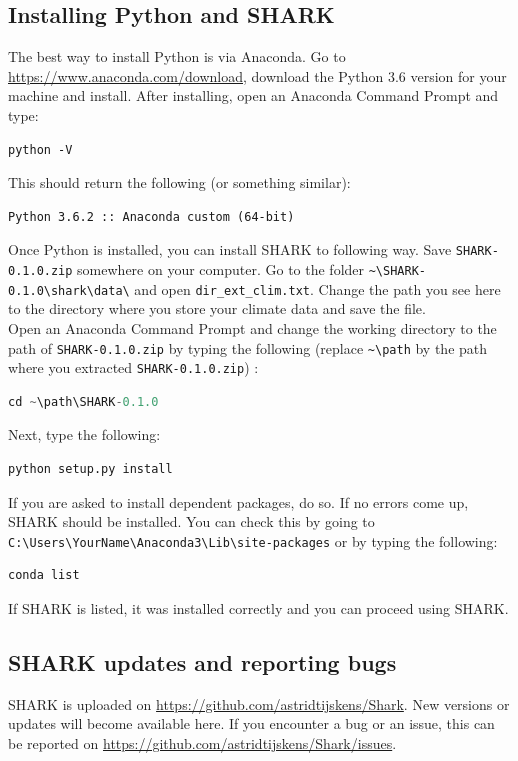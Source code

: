 \documentclass{article}
\newcommand{\file}[1]{{\small\texttt{#1}}}
\newcommand{\code}[1]{{\small\texttt{#1}}}
\begin{document}
\subsection{Installing Python and SHARK}
The best way to install Python is via Anaconda. Go to \url{https://www.anaconda.com/download}, download the Python 3.6 version for your machine and install. After installing, open an Anaconda Command Prompt and type:
\begin{lstlisting}[language=command.com]
python -V
\end{lstlisting}
This should return the following (or something similar):
\begin{lstlisting}[language=command.com]
Python 3.6.2 :: Anaconda custom (64-bit)
\end{lstlisting}
Once Python is installed, you can install SHARK to following way. Save \file{SHARK-0.1.0.zip} somewhere on your computer. Go to the folder \file{\textasciitilde{}\textbackslash{}SHARK-0.1.0\textbackslash{}shark\textbackslash{}data\textbackslash{}} and open \file{dir\_ext\_clim.txt}. Change the path you see here to the directory where you store your climate data and save the file. \\
Open an Anaconda Command Prompt and change the working directory to the path of \file{SHARK-0.1.0.zip} by typing the following (replace \code{\textasciitilde{}\textbackslash{}path} by the path where you extracted \file{SHARK-0.1.0.zip}) :
\begin{lstlisting}[language=python]
cd ~\path\SHARK-0.1.0
\end{lstlisting}
Next, type the following:
\begin{lstlisting}[language=command.com]
python setup.py install
\end{lstlisting}
If you are asked to install dependent packages, do so. If no errors come up, SHARK should be installed. You can check this by going to \file{C:\textbackslash{}Users\textbackslash{}YourName\textbackslash{}Anaconda3\textbackslash{}Lib\textbackslash{}site-packages} or by typing the following:
\begin{lstlisting}[language=command.com]
conda list
\end{lstlisting}
If SHARK is listed, it was installed correctly and you can proceed using SHARK.

\subsection{SHARK updates and reporting bugs}
SHARK is uploaded on \url{https://github.com/astridtijskens/Shark}. New versions or updates will become available here. If you encounter a bug or an issue, this can be reported on \url{https://github.com/astridtijskens/Shark/issues}.
\end{document}
